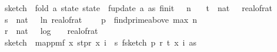 \begin{isabellebody}
\ \ \ {\isachardoublequoteopen}sketch\ {\isasymequiv}\ fold\ {\isacharparenleft}{\kern0pt}{\isasymlambda}a\ state{\isachardot}{\kern0pt}\ state\ {\isasymbind}\ f{}{\isacharunderscore}{\kern0pt}update\ a{\isacharparenright}{\kern0pt}\ as\ {\isacharparenleft}{\kern0pt}f{}{\isacharunderscore}{\kern0pt}init\ {\isasymdelta}\ {\isasymepsilon}\ n{\isacharparenright}{\kern0pt}{\isachardoublequoteclose}\isanewline
\ \ \ {\isachardoublequoteopen}t\ {\isasymequiv}\ nat\ {\isasymlceil}{}{}\ {\isacharslash}{\kern0pt}\ {\isacharparenleft}{\kern0pt}real{\isacharunderscore}{\kern0pt}of{\isacharunderscore}{\kern0pt}rat\ {\isasymdelta}{\isacharparenright}{\kern0pt}\isanewline
\ \ \ {\isachardoublequoteopen}s\ {\isasymequiv}\ nat\ {\isasymlceil}{\isacharminus}{\kern0pt}{\isacharparenleft}{\kern0pt}{}{}\ {\isacharasterisk}{\kern0pt}\ ln\ {\isacharparenleft}{\kern0pt}real{\isacharunderscore}{\kern0pt}of{\isacharunderscore}{\kern0pt}rat\ {\isasymepsilon}{\isacharparenright}{\kern0pt}{\isacharparenright}{\kern0pt}{\isasymrceil}{\isachardoublequoteclose}\isanewline
\ \ \ {\isachardoublequoteopen}p\ {\isasymequiv}\ find{\isacharunderscore}{\kern0pt}prime{\isacharunderscore}{\kern0pt}above\ {\isacharparenleft}{\kern0pt}max\ n\ {}{}{\isacharparenright}{\kern0pt}{\isachardoublequoteclose}\isanewline
\ \ \ {\isachardoublequoteopen}r\ {\isasymequiv}\ nat\ {\isacharparenleft}{\kern0pt}{}\ {\isacharasterisk}{\kern0pt}\ {\isasymlceil}log\ {}\ {\isacharparenleft}{\kern0pt}{}\ {\isacharslash}{\kern0pt}\ real{\isacharunderscore}{\kern0pt}of{\isacharunderscore}{\kern0pt}rat\ {\isasymdelta}{\isacharparenright}{\kern0pt}{\isasymrceil}\ {\isacharplus}{\kern0pt}\ {}{}{\isacharparenright}{\kern0pt}{\isachardoublequoteclose}\isanewline
\ \ \ {\isachardoublequoteopen}sketch\ {\isacharequal}{\kern0pt}\ map{\isacharunderscore}{\kern0pt}pmf\ {\isacharparenleft}{\kern0pt}{\isasymlambda}x{\isachardot}{\kern0pt}\ {\isacharparenleft}{\kern0pt}s{\isacharcomma}{\kern0pt}t{\isacharcomma}{\kern0pt}p{\isacharcomma}{\kern0pt}r{\isacharcomma}{\kern0pt}\ x{\isacharcomma}{\kern0pt}\ {\isasymlambda}i\ {\isasymin}\ {\isacharbraceleft}{\kern0pt}{}{\isachardot}{\kern0pt}{\isachardot}{\kern0pt}{\isacharless}{\kern0pt}s{\isacharbraceright}{\kern0pt}{\isachardot}{\kern0pt}\ f{}{\isacharunderscore}{\kern0pt}sketch\ p\ r\ t\ {\isacharparenleft}{\kern0pt}x\ i{\isacharparenright}{\kern0pt}\ as{\isacharparenright}{\kern0pt}{\isacharparenright}{\kern0pt}\isanewline

\end{isabellebody}

